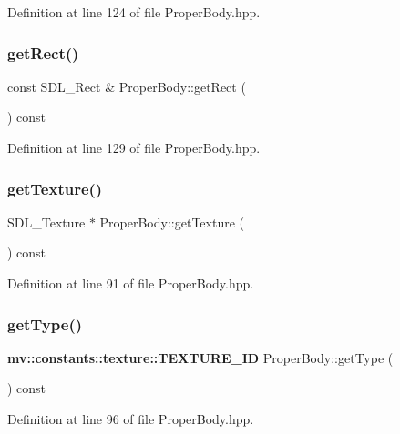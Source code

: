 Definition at line 124 of file Proper\+Body.\+hpp.

\mbox{\label{class_proper_body_ae7534aa8cdf0035cc8d0b125dbaf4ae2}} 
\subsubsection{get\+Rect()}
{\footnotesize\ttfamily const S\+D\+L\+\_\+\+Rect \& Proper\+Body\+::get\+Rect (\begin{DoxyParamCaption}{ }\end{DoxyParamCaption}) const\hspace{0.3cm}{\ttfamily [inline]}}



Definition at line 129 of file Proper\+Body.\+hpp.

\mbox{\label{class_proper_body_ad37f72f145f1436d634ed26f9f590d75}} 
\subsubsection{get\+Texture()}
{\footnotesize\ttfamily S\+D\+L\+\_\+\+Texture $\ast$ Proper\+Body\+::get\+Texture (\begin{DoxyParamCaption}{ }\end{DoxyParamCaption}) const\hspace{0.3cm}{\ttfamily [inline]}}



Definition at line 91 of file Proper\+Body.\+hpp.

\mbox{\label{class_proper_body_a2f081a6b893934047307b29514576428}} 
\subsubsection{get\+Type()}
{\footnotesize\ttfamily \textbf{ mv\+::constants\+::texture\+::\+T\+E\+X\+T\+U\+R\+E\+\_\+\+ID} Proper\+Body\+::get\+Type (\begin{DoxyParamCaption}{ }\end{DoxyParamCaption}) const\hspace{0.3cm}{\ttfamily [inline]}}



Definition at line 96 of file Proper\+Body.\+hpp.

